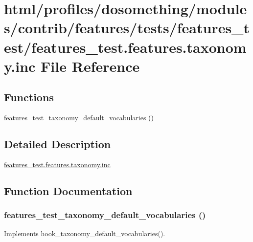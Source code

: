 \hypertarget{features__test_8features_8taxonomy_8inc}{
\section{html/profiles/dosomething/modules/contrib/features/tests/features\_\-test/features\_\-test.features.taxonomy.inc File Reference}
\label{features__test_8features_8taxonomy_8inc}
}
\subsection*{Functions}
\begin{DoxyCompactItemize}
\item 
\hyperlink{features__test_8features_8taxonomy_8inc_aaf95733ea3f972cb957799786e508c38}{features\_\-test\_\-taxonomy\_\-default\_\-vocabularies} ()
\end{DoxyCompactItemize}


\subsection{Detailed Description}
\hyperlink{features__test_8features_8taxonomy_8inc}{features\_\-test.features.taxonomy.inc} 

\subsection{Function Documentation}
\hypertarget{features__test_8features_8taxonomy_8inc_aaf95733ea3f972cb957799786e508c38}{
\subsubsection[{features\_\-test\_\-taxonomy\_\-default\_\-vocabularies}]{\setlength{\rightskip}{0pt plus 5cm}features\_\-test\_\-taxonomy\_\-default\_\-vocabularies ()}}
\label{features__test_8features_8taxonomy_8inc_aaf95733ea3f972cb957799786e508c38}
Implements hook\_\-taxonomy\_\-default\_\-vocabularies(). 